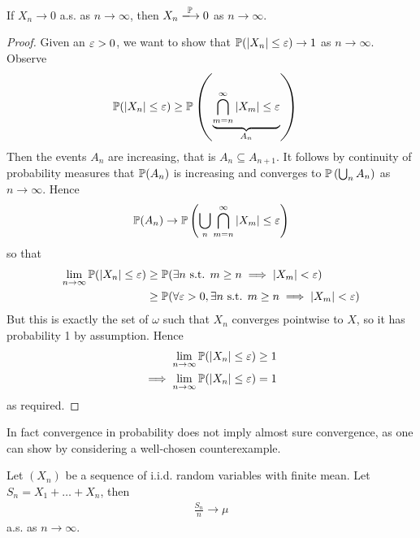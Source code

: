 \documentclass{../template/note}
\begin{document}
    \begin{proposition}
        If \(X_n \to 0\) a.s. as \(n \to \infty\), then \(X_n \pto 0\) as \(n \to \infty\).
    \end{proposition}
    
    \begin{proof}
        Given an \(\varepsilon > 0\), we want to show that \(\mathbb P(|X_n| \leq \varepsilon) \to 1\) as \(n \to \infty\). Observe
        \begin{align*}
            \mathbb P(|X_n| \leq \varepsilon) &\geq \mathbb P\left(\underbrace{\bigcap_{m=n}^\infty |X_m| \leq \varepsilon}_{A_n}\right)
        \end{align*}
        Then the events \(A_n\) are increasing, that is \(A_n \subseteq A_{n+1}\). It follows by continuity of probability measures that \(\mathbb P(A_n)\) is increasing and converges to \(\mathbb P\left(\bigcup_n A_n\right)\) as \(n \to \infty\). Hence
        \begin{align*}
            \mathbb P(A_n) \to \mathbb P\left(\bigcup_n \bigcap_{m=n}^\infty |X_m| \leq \varepsilon\right)
        \end{align*}
        so that
        \begin{align*}
            \lim_{n \to \infty} \mathbb P(|X_n| \leq \varepsilon) &\geq \mathbb P(\exists n \text{ s.t. } m \geq n \implies |X_m| < \varepsilon) \\
            &\geq \mathbb P(\forall \varepsilon > 0, \exists n \text{ s.t. } m \geq n \implies |X_m| < \varepsilon)
        \end{align*}
        But this is exactly the set of \(\omega\) such that \(X_n\) converges pointwise to \(X\), so it has probability 1 by assumption. Hence
        \begin{align*}
            \lim_{n \to \infty} \mathbb P(|X_n| \leq \varepsilon) &\geq 1 \\
            \implies \lim_{n \to \infty} \mathbb P(|X_n| \leq \varepsilon) &= 1
        \end{align*}
        as required.
    \end{proof}
    
    \begin{remark*}
        In fact convergence in probability does not imply almost sure convergence, as one can show by considering a well-chosen counterexample.
    \end{remark*}
    
    \begin{theorem}
        Let \((X_n)\) be a sequence of i.i.d. random variables with finite mean. Let \(S_n = X_1 + \dots + X_n\), then
        \begin{align*}
            \frac{S_n}n \to \mu
        \end{align*}
        a.s. as \(n \to \infty\).        
    \end{theorem}
\end{document}
